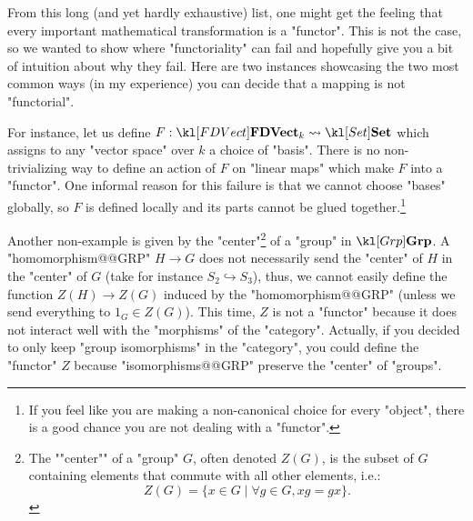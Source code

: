 \documentclass[main.tex]{subfiles}
\begin{document}
\begin{rem}
    From this long (and yet hardly exhaustive) list, one might get the feeling that every important mathematical transformation is a "functor". This is not the case, so we wanted to show where "functoriality" can fail and hopefully give you a bit of intuition about why they fail. Here are two instances showcasing the two most common ways (in my experience) you can decide that a mapping is not "functorial".
    
    For instance, let us define $F: \catFDVect{k} \rightsquigarrow \catSet$ which assigns to any "vector space" over $k$ a choice of "basis". There is no non-trivializing way to define an action of $F$ on "linear maps" which make $F$ into a "functor". One informal reason for this failure is that we cannot choose "bases" globally, so $F$ is defined locally and its parts cannot be glued together.\footnote{If you feel like you are making a non-canonical choice for every "object", there is a good chance you are not dealing with a "functor".}
	
	Another non-example is given by the "center"\footnote{The ""center"" of a "group" $G$, often denoted $Z(G)$, is the subset of $G$ containing elements that commute with all other elements, i.e.:
	\[Z(G) = \{x \in G \mid \forall g \in G, xg = gx\}.\]} of a "group" in $\catGrp$. A "homomorphism@@GRP" $H \rightarrow G$ does not necessarily send the "center" of $H$ in the "center" of $G$ (take for instance $S_2 \hookrightarrow S_3$), thus, we cannot easily define the function $Z(H) \rightarrow Z(G)$ induced by the "homomorphism@@GRP" (unless we send everything to $1_G \in Z(G)$). This time, $Z$ is not a "functor" because it does not interact well with the "morphisms" of the "category". Actually, if you decided to only keep "group isomorphisms" in the "category", you could define the "functor" $Z$ because "isomorphisms@@GRP" preserve the "center" of "groups".
\end{rem}
\end{document}
